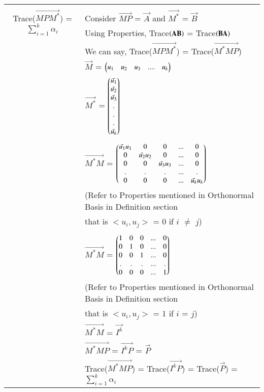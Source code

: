 \documentclass[journal,12pt]{IEEEtran}
\begin{document}
\begin{longtable}{|c|l|}
	&\\
	\hline
	\multirow{3}{*}{Trace($\vec{MP{M}^*}$) = $\sum_{i=1}^{k}\alpha_i$} & \\
	& Consider $\vec{MP}$ = $\vec{A}$ and $\vec{M^{*}}$ = $\vec{B}$\\
	& Using Properties, Trace$\mathbf{\left(AB\right)}$ = Trace$\mathbf{\left(BA\right)}$\\
	& We can say, Trace($\vec{MP{M}^*}$) = Trace($\vec{{M}^*MP}$)\\
	& $\vec{M}$ = $\begin{pmatrix}u_1&u_2&u_3&....&u_k\end{pmatrix}$ \\
	& $\vec{M^*}$ = $\begin{pmatrix}\Bar{u_1}\\\Bar{u_2}\\\Bar{u_3}\\.\\.\\.\\\Bar{u_k}\end{pmatrix}$ \\
	&\\
	& $\vec{M^{*}M}$ = $\begin{pmatrix}\Bar{u_1}u_1&0&0&...&0\\
	                           0&\Bar{u_2}u_2&0&...&0\\
	                           0&0&\Bar{u_3}u_3&...&0\\
	                           .&.&.&...&.\\
	                           0&0&0&...&\Bar{u_k}u_k\end{pmatrix}$\\
	 & (Refer to Properties mentioned in Orthonormal Basis in Definition section\\
	 & that is $<u_i,u_j>$ = $0$ if $i$ $\ne$ $j$)\\
	 & \\
	 & $\vec{M^{*}M}$ = $\begin{pmatrix}1&0&0&...&0\\
	                           0&1&0&...&0\\
	                           0&0&1&...&0\\
	                           .&.&.&...&.\\
	                           0&0&0&...&1\end{pmatrix}$\\
	& (Refer to Properties mentioned in Orthonormal Basis in Definition section\\
	& that is $<u_i,u_j>$ = $1$ if $i$ = $j$)\\
    & $\vec{M^*M}$ = $\vec{I^{k}}$\\
    & $\vec{M^*MP}$ = $\vec{I^{k}P}$ = $\vec{P}$\\
    & Trace($\vec{{M}^*MP}$) = Trace($\vec{I^{k}P}$) =  Trace($\vec{P}$) = $\sum_{i=1}^{k}\alpha_i$\\

\end{longtable}
\end{document}

